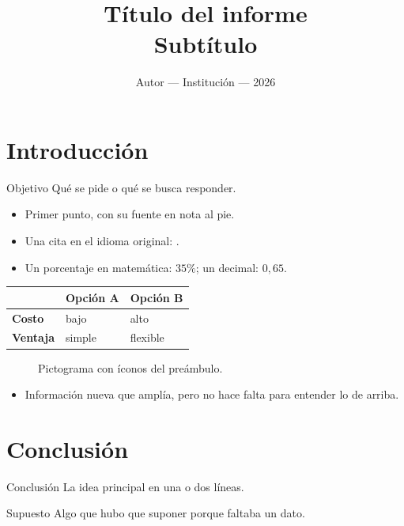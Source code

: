 \documentclass[11pt,a4paper]{article}
\title{\vspace{-1.5cm}\textbf{Título del informe}\\[3pt]
\large Subtítulo}
\author{\normalsize Autor --- Institución --- 2026}
\date{}
\begin{document}
\maketitle
\vspace{-1cm}

\indice

\section{Introducción}

\begin{recuadro}{Objetivo}
Qué se pide o qué se busca responder.
\end{recuadro}

\begin{itemize}
  \item Primer punto, con su fuente en nota al pie.
  \item Una cita en el idioma original: .
  \item Un porcentaje en matemática: $35\%$; un decimal: $0{,}65$.
\end{itemize}

\begin{center}
\small
\begin{tabularx}{\linewidth}{@{}>{\bfseries}l X X@{}}
\toprule
 & \textbf{Opción A} & \textbf{Opción B} \\
\midrule
Costo & bajo & alto \\
Ventaja & simple & flexible \\
\bottomrule
\end{tabularx}
\end{center}

\begin{figure}[h]
\centering
{}
\caption{Pictograma con íconos del preámbulo.}
\end{figure}

\begin{extras}
\begin{itemize}
  \item Información nueva que amplía, pero no hace falta para entender lo de arriba.
\end{itemize}
\end{extras}

\section{Conclusión}

\begin{destacado}{Conclusión}
La idea principal en una o dos líneas.
\end{destacado}

\begin{aviso}{Supuesto}
Algo que hubo que suponer porque faltaba un dato.
\end{aviso}
\end{document}
